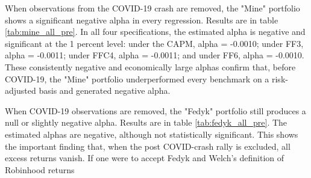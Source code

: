When observations from the COVID-19 crash are removed, the "Mine" portfolio shows a significant negative alpha in every regression.  
Results are in table \ref{tab:mine_all_pre}.
In all four specifications, the estimated alpha is negative and significant at the 1 percent level: 
under the CAPM, alpha = -0.0010; under FF3, alpha = -0.0011; under FFC4, alpha = -0.0011; and under FF6, alpha = -0.0010. 
These consistently negative and economically large alphas confirm that, before COVID-19, the "Mine" portfolio underperformed every benchmark on a risk-adjusted basis and generated negative alpha.



When COVID-19 observations are removed, the "Fedyk" portfolio still produces a null or slightly negative alpha.  
Results are in table \ref{tab:fedyk_all_pre}.
The estimated alphas are negative, although not statistically significant. 
This shows the important finding that, when the post COVID-crash rally is excluded, all excess returns vanish.
If one were to accept Fedyk and Welch's definition of Robinhood returns 